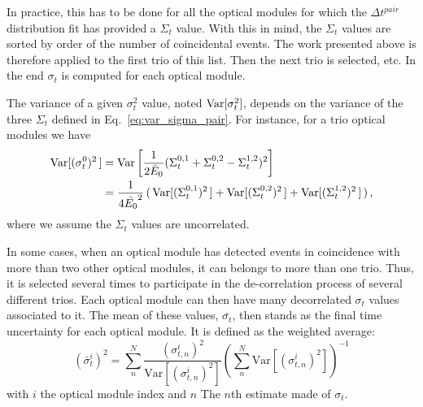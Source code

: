 In practice, this has to be done for all the optical modules for which the $\Delta {t}^{pair}$ distribution fit has provided a $\Sigma_{t}$ value.
With this in mind, the $\Sigma_{t}$ values are sorted by order of the number of coincidental events.
The work presented above is therefore applied to the first trio of this list.
Then the next trio is selected, etc.
In the end $\sigma_{t}$ is computed for each optical module.

The variance of a given $\sigma_{t}^{2}$ value, noted $\mathrm{Var}[\sigma_{t}^{2}]$, depends on the variance of the three $\Sigma_{t}$ defined in Eq.~\eqref{eq:var_sigma_pair}.
For instance, for a trio optical modules we have
\begin{align}
  \mathrm{Var}[(\sigma_{t}^{0})^{2}\,] &= \mathrm{Var} \left[ \frac{1}{2\bar{E}_{0}} (\Sigma_{t}^{0,1}+\Sigma_{t}^{0,2}-\Sigma_{t}^{1,2})^{2} \right] \\
  &= \frac{1}{4\bar{E_{0}}^{2}}\, (\,\mathrm{Var}[(\Sigma_{t}^{0,1})^{2}\,]+\mathrm{Var}[(\Sigma_{t}^{0,2})^{2}\,]+\mathrm{Var}[(\Sigma_{t}^{1,2})^{2}\,]\,)\,,
\end{align}
where we assume the $\Sigma_{t}$ values are uncorrelated.

In some cases, when an optical module has detected events in coincidence with more than two other optical modules, it can belongs to more than one trio.
Thus, it is selected several times to participate in the de-correlation process of several different trios.
Each optical module can then have many decorrelated $\sigma_{t}$ values associated to it.
The mean of these values, $\bar{\sigma_{t}}$, then stands as the final time uncertainty for each optical module.
It is defined as the weighted average:
\begin{equation}
  \displaystyle
 (\bar\sigma^i_{t})^2 = \sum_n^N  \dfrac{(\sigma^i_{t, n})^2}{\text{Var}[(\sigma^i_{t, n})^2]} \left(\sum_n^N \text{Var}[(\sigma^i_{t, n})^2]\right)^{-1}
\end{equation}
with $i$ the optical module index and $n$ The $n$th estimate made of $\sigma_{t}$.

